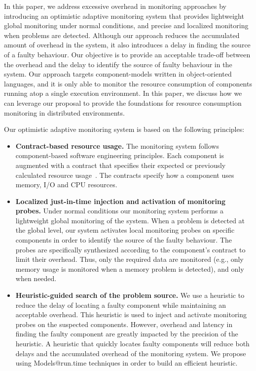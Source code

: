 In this paper, we address excessive overhead in monitoring approaches by introducing an optimistic adaptive monitoring system that provides lightweight global monitoring under normal conditions, and precise and localized monitoring when problems are detected.
Although our approach reduces the accumulated amount of overhead in the system, it also introduces a delay in finding the source of a faulty behaviour.
Our objective is to provide an acceptable trade-off between the overhead and the delay to identify the source of faulty behaviour in the system.
Our approach targets component-models written in object-oriented languages, and it is only able to monitor the resource consumption of components running atop a single execution environment.
In this paper, we discuss how we can leverage our proposal to provide the foundations for resource consumption monitoring in distributed environments. 

Our optimistic adaptive monitoring system is based on the following principles:
\begin{itemize}
\leftskip -.2in %
 \item \textbf{Contract-based resource usage.}
The monitoring system follows component-based software engineering principles. 
Each component is augmented with a contract that specifies their expected or previously calculated resource usage~\cite{Beugnard:1999:MCC:619042.621275}. 
The contracts specify how a component uses memory, I/O and CPU resources.
 \item \textbf{Localized just-in-time injection and activation of monitoring probes.} 
Under normal conditions our monitoring system performs a lightweight global monitoring of the system. 
When a problem is detected at the global level, our system activates local monitoring probes on specific components in order to identify the source of the faulty behaviour.
The probes are specifically synthesized according to the component's contract to limit their overhead.
Thus, only the required data are monitored (e.g., only memory usage is monitored when a memory problem is detected), and only when needed.
  \item \textbf{Heuristic-guided search of the problem source.} 
We use a heuristic to reduce the delay of locating a faulty component while maintaining an acceptable overhead.
This heuristic is used to inject and activate monitoring probes on the suspected components. 
However, overhead and latency in finding the faulty component are greatly impacted by the precision of the heuristic.
A heuristic that quickly locates faulty components will reduce both delays and the accumulated overhead of the monitoring system.
We propose using Models@run.time techniques in order to build an efficient heuristic.

\end{itemize}

